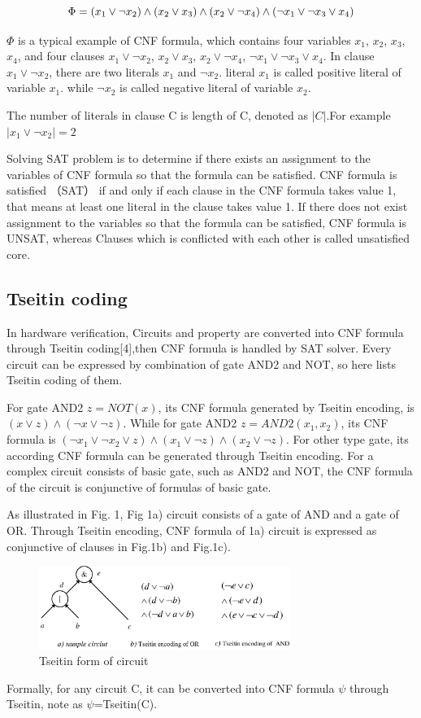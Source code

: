 \documentclass[runningheads,a4paper]{llncs}
\begin{document}
\begin{equation}
\centering \Phi=(x_1\vee \neg x_2)\wedge(x_2\vee x_3)\wedge(x_2\vee \neg x_4)\wedge( \neg x_1\vee \neg x_3\vee x_4)
\end{equation}

$\Phi$ is a typical example of CNF formula, which contains four variables $x_1$, $x_2$, $x_3$, $x_4$, 
and four clauses $x_1\vee \neg x_2$, $x_2\vee x_3$, $x_2\vee \neg x_4$, $ \neg x_1\vee \neg x_3\vee x_4$.
In clause $x_1\vee \neg x_2$, there are two literals $x_1$ and $ \neg x_2$.
literal $x_1$ is called positive literal of variable $x_1$.
while $ \neg x_2$ is called negative literal of variable $x_2$.

The number of literals in clause C is length of C, denoted as $|C|$.For example $| x_1\vee  \neg x_2 | =2$

Solving SAT problem is to determine if there exists an assignment to the variables of CNF formula so that the formula can be satisfied. 
CNF formula is satisfied （SAT） if and only if each clause in the CNF formula takes value 1, that means at least one literal in the clause takes value 1.
If there does not exist assignment to the variables so that the formula can be satisfied, CNF formula is UNSAT, whereas Clauses which is conflicted with each other is called unsatisfied core.
\subsection{Tseitin coding}

In hardware verification, Circuits and property are converted into CNF formula through Tseitin coding[4],then CNF formula is handled by SAT solver. 
Every circuit can be expressed by combination of gate AND2 and NOT, so here lists Tseitin coding of them. 

For gate AND2  $z=NOT(x)$, its CNF formula generated by Tseitin encoding, is  $(x\vee z)\wedge( \neg x\vee \neg z)$.
While for gate AND2 $z=AND2(x_1,x_2)$, its CNF formula is $( \neg x_1\vee \neg x_2\vee z)\wedge(x_1\vee \neg z) \wedge(x_2\vee \neg z)$.
For other type gate, its according CNF formula can be generated through Tseitin encoding.
For a complex circuit consists of basic gate, such as AND2 and NOT, the CNF formula of the circuit is conjunctive of formulas of basic gate.

As illustrated in Fig. 1, Fig 1a) circuit consists of a gate of AND and a gate of OR.
Through Tseitin encoding, CNF formula of 1a) circuit  is expressed as conjunctive of clauses in Fig.1b) and Fig.1c).
\begin{figure}
\centering
\includegraphics[width=8.2cm]{a1}
\caption{Tseitin form of circuit}
\end{figure}
Formally, for any circuit C, it can be converted into CNF formula $\psi$ through Tseitin, note as $\psi$=Tseitin(C).
\end{document}
